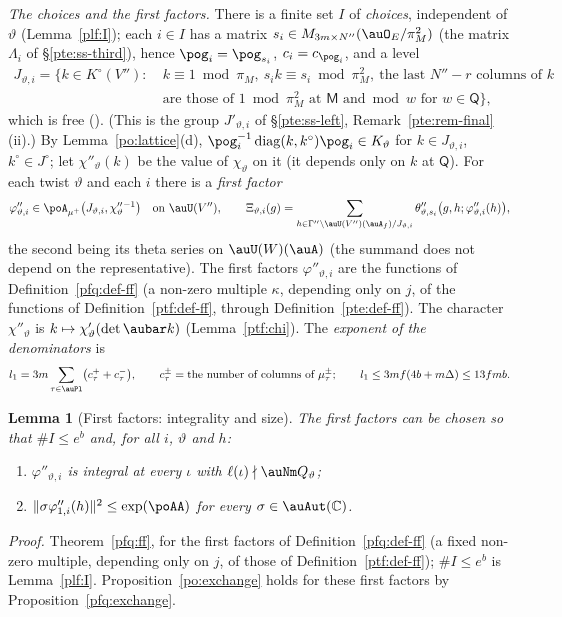 \documentclass[10pt]{amsart}
\newtheorem{lemma}[theorem]{Lemma}
\theoremstyle{definition}
\theoremstyle{remark}
\newcommand{\C}{\mathbb C}
\begin{document}
\emph{The choices and the first factors.} There is a finite set
$I$ of \emph{choices}, independent of $\vartheta$ (Lemma~\ref{plf:I}); each $i\in I$ has a matrix $s_i\in M_{3m\times
N''}(\auO_E/\pi_M^2)$ (the matrix $\Lambda_i$ of \S\ref{pte:ss-third}), hence $\pog_i=\pog_{s_i}$, $c_i=c_{\pog_i}$, and a level
\[
\begin{aligned}J_{\vartheta,i}=\{k\in K^\circ(V''):\ &k\equiv1\bmod\pi_M,\ s_ik\equiv s_i\bmod\pi_M^2,\ \text{the last }N''-r
\text{ columns of }k\\&\text{are those of }1\bmod\pi_M^2\text{ at }\mathsf M\text{ and}\bmod w\text{ for }w\in\mathsf Q\},\end{aligned}
\]
which is free ({\cite[Lemma~14.5]{P46}}). (This is the group $J'_{\vartheta,i}$ of \S\ref{pte:ss-left}, Remark~\ref{pte:rem-final}(ii).) By Lemma~\ref{po:lattice}(d), $\pog_i^{-1}\operatorname{diag}
(k,k^\circ)\pog_i\in K_\vartheta$ for $k\in J_{\vartheta,i}$, $k^\circ\in J^\circ$; let
$\chi''_{\vartheta}(k)$ be the value of $\chi_\vartheta$ on it (it depends only on $k$ at
$\mathsf Q$). For each twist $\vartheta$ and each $i$ there is a \emph{first factor}
\[
\varphi''_{\vartheta,i}\in\poA_{\mu^+}\bigl(J_{\vartheta,i},\chi''_\vartheta{}^{-1}\bigr)\quad
\text{on }\auU(V''),\qquad\Xi_{\vartheta,i}(g)=\sum_{h\in\Gamma''\backslash\auU(V'')(\auA_f)/
J_{\vartheta,i}}\theta''_{\vartheta,s_i}\bigl(g,h;\varphi''_{\vartheta,i}(h)\bigr),
\]
the second being its theta series on $\auU(W)(\auA)$ (the summand does not depend on the
representative). The first factors $\varphi''_{\vartheta,i}$ are the functions of Definition~\ref{pfq:def-ff} (a
non-zero multiple $\kappa$, depending only on $j$, of the functions of Definition~\ref{ptf:def-ff}, through
Definition~\ref{pte:def-ff}). The character $\chi''_\vartheta$ is
$k\mapsto\chi'_\vartheta(\det\aubar k)$ (Lemma~\ref{ptf:chi}). The \emph{exponent of the denominators} is
\[
l_1=3m\sum_{\tau\in\auPl}\bigl(c^+_\tau+c^-_\tau\bigr),\qquad c^\pm_\tau=\text{the number of
columns of }\mu^\pm_\tau;\qquad l_1\le3mf(4b+m\Delta)\le13fmb .
\]

\begin{lemma}[First factors: integrality and size]\label{po:ff}
The first factors can be chosen so that $\#I\le e^b$ and, for all $i$, $\vartheta$ and $h$:
\begin{enumerate}
\item[(I1)] $\varphi''_{\vartheta,i}$ is integral at every $\iota$ with $\ell(\iota)\nmid\auNm
Q_\vartheta$;
\item[(I2)] $\|\sigma\varphi''_{1,i}(h)\|^2\le\exp(\poAA)$ for every $\sigma\in\auAut(\C)$.
\end{enumerate}
\end{lemma}
\noindent\emph{Proof.} Theorem~\ref{pfq:ff}, for the first factors of Definition~\ref{pfq:def-ff}
(a fixed non-zero multiple, depending only on $j$, of those of Definition~\ref{ptf:def-ff}); $\#I\le e^b$
is Lemma~\ref{plf:I}. Proposition~\ref{po:exchange} holds for these first factors by
Proposition~\ref{pfq:exchange}.
\end{document}
